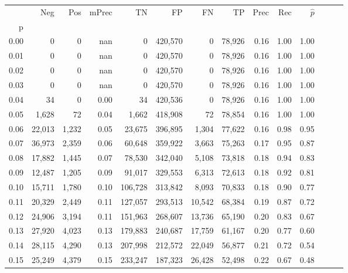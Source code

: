 \begin{tabular}{rrrrrrrrrrrrrr}
\toprule
{} &     Neg &    Pos & mPrec &       TN &       FP &      FN &      TP &  Prec &   Rec & $\hat{p}$ \\
p    &         &        &       &          &          &         &         &       &       &           \\
\midrule
0.00 &       0 &      0 &   nan &        0 &  420,570 &       0 &  78,926 &  0.16 &  1.00 &      1.00 \\
0.01 &       0 &      0 &   nan &        0 &  420,570 &       0 &  78,926 &  0.16 &  1.00 &      1.00 \\
0.02 &       0 &      0 &   nan &        0 &  420,570 &       0 &  78,926 &  0.16 &  1.00 &      1.00 \\
0.03 &       0 &      0 &   nan &        0 &  420,570 &       0 &  78,926 &  0.16 &  1.00 &      1.00 \\
0.04 &      34 &      0 &  0.00 &       34 &  420,536 &       0 &  78,926 &  0.16 &  1.00 &      1.00 \\
0.05 &   1,628 &     72 &  0.04 &    1,662 &  418,908 &      72 &  78,854 &  0.16 &  1.00 &      1.00 \\
0.06 &  22,013 &  1,232 &  0.05 &   23,675 &  396,895 &   1,304 &  77,622 &  0.16 &  0.98 &      0.95 \\
0.07 &  36,973 &  2,359 &  0.06 &   60,648 &  359,922 &   3,663 &  75,263 &  0.17 &  0.95 &      0.87 \\
0.08 &  17,882 &  1,445 &  0.07 &   78,530 &  342,040 &   5,108 &  73,818 &  0.18 &  0.94 &      0.83 \\
0.09 &  12,487 &  1,205 &  0.09 &   91,017 &  329,553 &   6,313 &  72,613 &  0.18 &  0.92 &      0.81 \\
0.10 &  15,711 &  1,780 &  0.10 &  106,728 &  313,842 &   8,093 &  70,833 &  0.18 &  0.90 &      0.77 \\
0.11 &  20,329 &  2,449 &  0.11 &  127,057 &  293,513 &  10,542 &  68,384 &  0.19 &  0.87 &      0.72 \\
0.12 &  24,906 &  3,194 &  0.11 &  151,963 &  268,607 &  13,736 &  65,190 &  0.20 &  0.83 &      0.67 \\
0.13 &  27,920 &  4,023 &  0.13 &  179,883 &  240,687 &  17,759 &  61,167 &  0.20 &  0.77 &      0.60 \\
0.14 &  28,115 &  4,290 &  0.13 &  207,998 &  212,572 &  22,049 &  56,877 &  0.21 &  0.72 &      0.54 \\
0.15 &  25,249 &  4,379 &  0.15 &  233,247 &  187,323 &  26,428 &  52,498 &  0.22 &  0.67 &      0.48 \\

\end{tabular}

